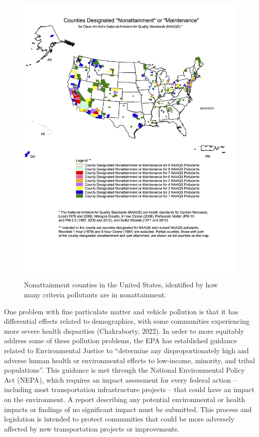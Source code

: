 \documentclass[
  letterpaper,
  authoryear,
  review,
  3p]{elsarticle}
\begin{document}
\begin{figure}

{\centering \includegraphics[width=6in,height=\textheight]{images/mapnmpoll.png}

}

\caption{\label{fig-nonattainment}Nonattainment counties in the United
States, identified by how many criteria pollutants are in
nonattainment.}

\end{figure}

One problem with fine particulate matter and vehicle pollution is that
it has differential effects related to demographics, with some
communities experiencing more severe health disparities (Chakraborty,
2022). In order to more equitably address some of these pollution
problems, the EPA has established guidance related to Environmental
Justice to ``determine any disproportionately high and adverse human
health or environmental effects to low-income, minority, and tribal
populations''. This guidance is met through the National Environmental
Policy Act (NEPA), which requires an impact assessment for every federal
action -- including most transportation infrastructure projects -- that
could have an impact on the environment. A report describing any
potential environmental or health impacts or findings of no significant
impact must be submitted. This process and legislation is intended to
protect communities that could be more adversely affected by new
transportation projects or improvements.
\end{document}
